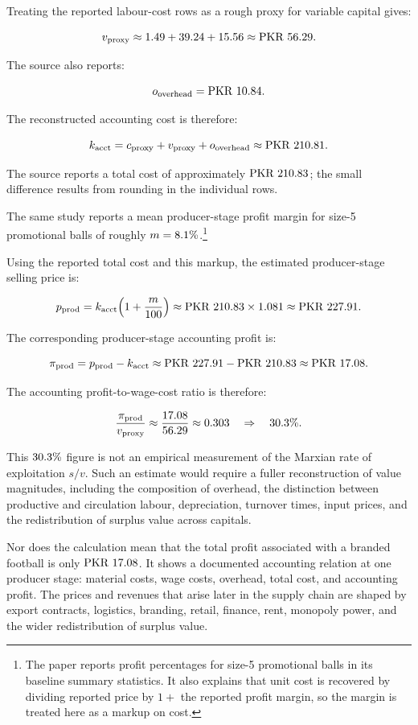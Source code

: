 \begin{example}
Treating the reported labour-cost rows as a rough proxy for variable capital
gives:

\[
v_{\text{proxy}}
\approx
1.49+39.24{}+15.56
\approx
\text{PKR }56.29{}.
\]

The source also reports:

\[
o_{\text{overhead}}
=
\text{PKR }10.84{}.
\]

The reconstructed accounting cost is therefore:

\[
k_{\text{acct}}
=
c_{\text{proxy}}
+
v_{\text{proxy}}
+
o_{\text{overhead}}
\approx
\text{PKR }210.81{}.
\]

The source reports a total cost of approximately
\(\text{PKR }210.83{}\); the small difference results from rounding in the
individual rows.

The same study reports a mean producer-stage profit margin for size-5
promotional balls of roughly \(m=8.1{}\%\).\footnote{The paper reports profit
percentages for size-5 promotional balls in its baseline summary statistics.
It also explains that unit cost is recovered by dividing reported price by
\(1+\) the reported profit margin, so the margin is treated here as a markup
on cost.}

Using the reported total cost and this markup, the estimated producer-stage
selling price is:

\[
p_{\text{prod}}
=
k_{\text{acct}}
\Bigl(1+\frac{m}{100}\Bigr)
\approx
\text{PKR }210.83{} \times 1.081
\approx
\text{PKR }227.91{}.
\]

The corresponding producer-stage accounting profit is:

\[
\pi_{\text{prod}}
=
p_{\text{prod}}-k_{\text{acct}}
\approx
\text{PKR }227.91{}
-
\text{PKR }210.83{}
\approx
\text{PKR }17.08{}.
\]

The accounting profit-to-wage-cost ratio is therefore:

\[
\frac{\pi_{\text{prod}}}{v_{\text{proxy}}}
\approx
\frac{17.08}{56.29}
\approx
0.303
\quad\Rightarrow\quad
30.3{}\%.
\]

This \(30.3{}\%\) figure is not an empirical measurement of the Marxian rate of
exploitation \(s/v\). Such an estimate would require a fuller reconstruction
of value magnitudes, including the composition of overhead, the distinction
between productive and circulation labour, depreciation, turnover times, input
prices, and the redistribution of surplus value across capitals.

Nor does the calculation mean that the total profit associated with a branded
football is only \(\text{PKR }17.08{}\). It shows a documented accounting
relation at one producer stage: material costs, wage costs, overhead, total
cost, and accounting profit. The prices and revenues that arise later in the
supply chain are shaped by export contracts, logistics, branding, retail,
finance, rent, monopoly power, and the wider redistribution of surplus value.

\end{example}

